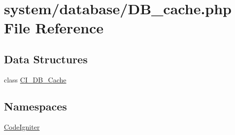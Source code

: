\hypertarget{_d_b__cache_8php}{\section{system/database/\-D\-B\-\_\-cache.php File Reference}
\label{_d_b__cache_8php}
}
\subsection*{Data Structures}
\begin{DoxyCompactItemize}
\item 
class \hyperlink{class_c_i___d_b___cache}{C\-I\-\_\-\-D\-B\-\_\-\-Cache}
\end{DoxyCompactItemize}
\subsection*{Namespaces}
\begin{DoxyCompactItemize}
\item 
\hyperlink{namespace_code_igniter}{Code\-Igniter}
\end{DoxyCompactItemize}
